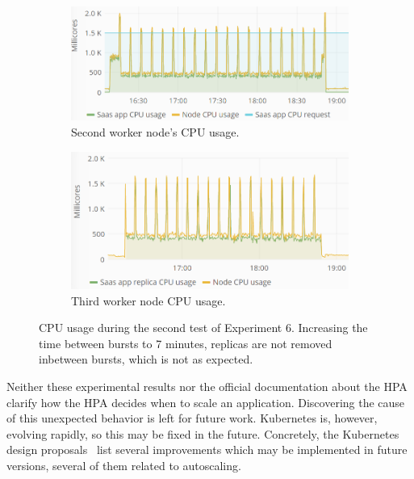 \begin{figure}
\centering
\begin{subfigure}[b]{\columnwidth}
\centering
\includegraphics[width=0.70\columnwidth]{Images/Experiments/CPU/Grafana/cpu-saas-hpa-bursty-3-1.PNG}
\caption{Second worker node's CPU usage.}
\label{fig:cpu-saas-hpa-bursty-3-1}
\end{subfigure}
\hfill
\begin{subfigure}[b]{\columnwidth}
\centering
\includegraphics[width=0.70\columnwidth]{Images/Experiments/CPU/Grafana/cpu-saas-hpa-bursty-3-2.PNG}
\caption{Third worker node CPU usage.}
\label{fig:cpu-saas-hpa-bursty-3-2}
\end{subfigure}
\hfill
\vspace*{-7mm}
\caption{CPU usage during the second test of Experiment 6. Increasing the time between bursts to 7 minutes, replicas are not removed inbetween bursts, which is not as expected.}
\label{fig:cpu-saas-hpa-bursty-2}
\end{figure}

Neither these experimental results nor the official documentation about the HPA~\citep{hpa-algorithm-details} clarify how the HPA decides when to scale an application. Discovering the cause of this unexpected behavior is left for future work. Kubernetes is, however, evolving rapidly, so this may be fixed in the future. Concretely, the Kubernetes design proposals~\citep{autoscaling-design-proposals} list several improvements which may be implemented in future versions, several of them related to autoscaling. 


